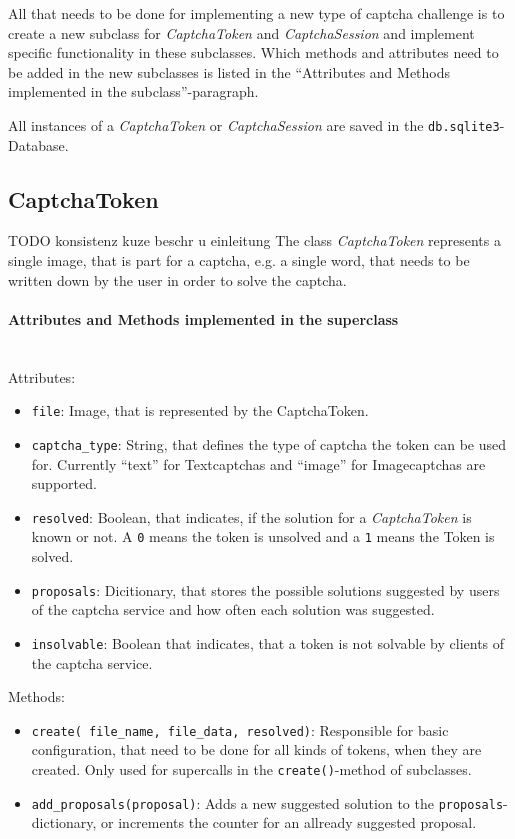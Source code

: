 All that needs to be done for implementing a new type of captcha challenge is to create a new subclass for \emph{CaptchaToken} and \emph{CaptchaSession} and implement specific functionality in these subclasses. Which methods and attributes need to be added in the new subclasses is listed in the ``Attributes and Methods implemented in the subclass''-paragraph.


All instances of a \emph{CaptchaToken} or \emph{CaptchaSession} are saved in the \verb|db.sqlite3|-Database. 

\subsection{CaptchaToken}
TODO konsistenz kuze beschr u einleitung
The class \emph{CaptchaToken} represents a single image, that is part for a captcha, e.g. a single word, that needs to be written down by the user in order to solve the captcha.

\paragraph{Attributes and Methods implemented in the superclass} \mbox{} \\

Attributes:

\begin{itemize}
\item \verb|file|: Image, that is represented by the CaptchaToken.
\item \verb|captcha_type|: String, that defines the type of captcha the token can be used for. Currently ``text'' for Textcaptchas and ``image'' for Imagecaptchas are supported.
\item \verb|resolved|: Boolean, that indicates, if the solution for a \emph{CaptchaToken} is known or not. A \verb|0| means the token is unsolved and a \verb|1| means the Token is solved.
\item \verb|proposals|: Dicitionary, that stores the possible solutions suggested by users of the captcha service and how often each solution was suggested.
\item \verb|insolvable|: Boolean that indicates, that a token is not solvable by clients of the captcha service.
\end{itemize}

Methods:

\begin{itemize}
\item \verb|create( file_name, file_data, resolved)|: Responsible for basic configuration, that need to be done for all kinds of tokens, when they are created. Only used for supercalls in the \verb|create()|-method of subclasses.
\item \verb|add_proposals(proposal)|: Adds a new suggested solution to the \verb|proposals|-dictionary, or increments the counter for an allready suggested proposal.
\end{itemize}

